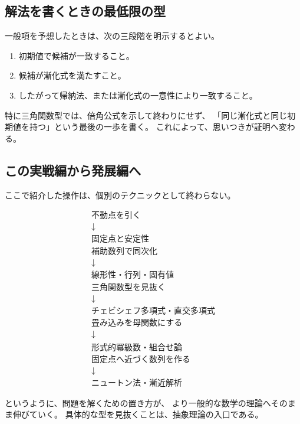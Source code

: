 \subsection{解法を書くときの最低限の型}

一般項を予想したときは、次の三段階を明示するとよい。

\begin{enumerate}
  \item 初期値で候補が一致すること。
  \item 候補が漸化式を満たすこと。
  \item したがって帰納法、または漸化式の一意性により一致すること。
\end{enumerate}

特に三角関数型では、倍角公式を示して終わりにせず、
「同じ漸化式と同じ初期値を持つ」という最後の一歩を書く。
これによって、思いつきが証明へ変わる。

\subsection{この実戦編から発展編へ}

ここで紹介した操作は、個別のテクニックとして終わらない。

\[
  \begin{array}{c}
    \text{不動点を引く}          \\
    \downarrow             \\
    \text{固定点と安定性}         \\[2mm]
    \text{補助数列で同次化}        \\
    \downarrow             \\
    \text{線形性・行列・固有値}      \\[2mm]
    \text{三角関数型を見抜く}       \\
    \downarrow             \\
    \text{チェビシェフ多項式・直交多項式} \\[2mm]
    \text{畳み込みを母関数にする}     \\
    \downarrow             \\
    \text{形式的冪級数・組合せ論}     \\[2mm]
    \text{固定点へ近づく数列を作る}    \\
    \downarrow             \\
    \text{ニュートン法・漸近解析}
  \end{array}
\]

というように、問題を解くための置き方が、
より一般的な数学の理論へそのまま伸びていく。
具体的な型を見抜くことは、抽象理論の入口である。
